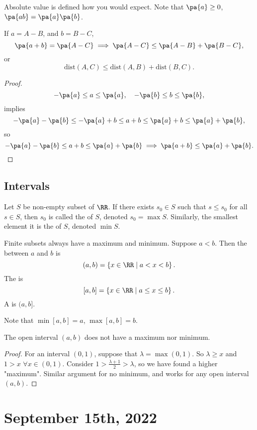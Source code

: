 \documentclass[11pt]{scrartcl}
\numberwithin{equation}{section}
\begin{document}
Absolute value is defined how you would expect. 
Note that $\pa{a} \geq 0$, $\pa{ab} = \pa{a}\pa{b}$.
\begin{theorem}
    \label{thm:tri_ineq}
    If $a=A-B$, and $b=B-C$,
    \[ \pa{a+b} = \pa{A-C} \implies \pa{A-C} \leq \pa{A-B}+\pa{B-C},\]
    or 
    \[\mathrm{dist}(A,C) \leq \mathrm{dist}(A,B) + \mathrm{dist}(B,C).\]
\end{theorem}

\begin{proof}
    \[ -\pa{a} \leq a \leq \pa{a},\quad -\pa{b}\leq b\leq \pa{b},\]
    implies
    \[ -\pa{a}-\pa{b}\leq -\pa{a}+b\leq a+b \leq \pa{a}+b\leq \pa{a}+\pa{b}, \]
    so 
    \[ -\pa{a}-\pa{b}\leq a+b \leq \pa{a}+\pa{b} \implies \pa{a+b} \leq \pa{a}+\pa{b}.  \qedhere\]
\end{proof}

\subsection{Intervals}
\begin{definition}
    Let $S$ be non-empty subset of $\RR$. If there exists $s_0\in S$ 
    such that $s\leq s_0$ for all $s\in S$, then $s_0$ is called the 
     of $S$, denoted $s_0 = \max{S}$.
    Similarly, the smallest element it is the 
     of $S$, denoted $\min{S}$.
\end{definition}
\begin{definition}
    Finite subsets always have a maximum and minimum.
    Suppose $a < b$. Then the  between $a$ and $b$ is 
    \[ (a,b) = \left\{x\in\RR \mid a <x<b\right\}. \]
    The  is 
    \[ [a,b] = \left\{x\in\RR \mid a\leq x\leq b\right\}. \]
    A  is $(a,b]$.
\end{definition}
Note that $\min[a,b] = a$, $\max[a,b] = b$.
\begin{proposition}
    The open interval $(a,b)$ does not have a maximum nor minimum.
\end{proposition}
\begin{proof}
    For an interval $(0,1)$, suppose that $\lambda=\max(0,1)$. So $\lambda\geq x$ and $1 > x$ $\forall x\in(0,1)$. Consider $1>\frac{\lambda+1}{2} > \lambda$, so 
    we have found a higher "maximum".
    Similar argument for no minimum, and works for any open interval $(a,b)$.
\end{proof}
\clearpage
\section{September 15th, 2022}
\end{document}
